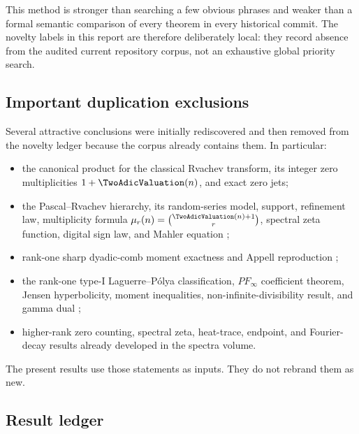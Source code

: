 \documentclass[11pt,oneside]{article}
\theoremstyle{definition}
\theoremstyle{remark}
\begin{document}
This method is stronger than searching a few obvious phrases and weaker than a
formal semantic comparison of every theorem in every historical commit.  The
novelty labels in this report are therefore deliberately local: they record
absence from the audited current repository corpus, not an exhaustive global
priority search.

\subsection{Important duplication exclusions}

Several attractive conclusions were initially rediscovered and then removed
from the novelty ledger because the corpus already contains them.  In
particular:

\begin{itemize}
\item the canonical product for the classical Rvachev transform, its integer
zero multiplicities $1+\TwoAdicValuation(n)$, and exact zero jets;
\item the Pascal--Rvachev hierarchy, its random-series model, support,
refinement law, multiplicity formula
$\mu_r(n)=\binom{\TwoAdicValuation(n)+1}{r}$, spectral zeta function, digital sign law,
and Mahler equation \cite{repo-spectra};
\item rank-one sharp dyadic-comb moment exactness and Appell reproduction
\cite{repo-comb,repo-compilations};
\item the rank-one type-I Laguerre--P\'olya classification, $PF_\infty$
coefficient theorem, Jensen hyperbolicity, moment inequalities,
non-infinite-divisibility result, and gamma dual \cite{repo-compilations};
\item higher-rank zero counting, spectral zeta, heat-trace, endpoint, and
Fourier-decay results already developed in the spectra volume.
\end{itemize}

The present results use those statements as inputs.  They do not rebrand them
as new.

\subsection{Result ledger}
\end{document}
